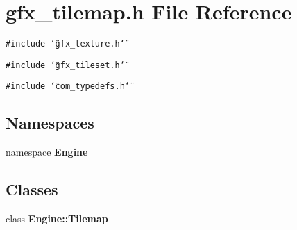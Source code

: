 \section{gfx\_\-tilemap.h File Reference}
\label{gfx__tilemap_8h}
{\tt \#include \char`\"{}gfx\_\-texture.h\char`\"{}}\par
{\tt \#include \char`\"{}gfx\_\-tileset.h\char`\"{}}\par
{\tt \#include \char`\"{}com\_\-typedefs.h\char`\"{}}\par
\subsection*{Namespaces}
\begin{CompactItemize}
\item 
namespace {\bf Engine}
\end{CompactItemize}
\subsection*{Classes}
\begin{CompactItemize}
\item 
class {\bf Engine::Tilemap}
\end{CompactItemize}
